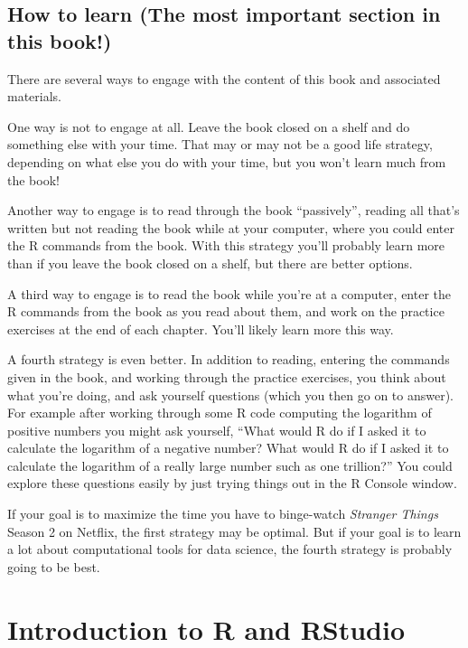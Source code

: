 \documentclass[]{krantz}
\begin{document}
\hypertarget{how-to-learn-the-most-important-section-in-this-book}{%
\section{How to learn (The most important section in this book!)}\label{how-to-learn-the-most-important-section-in-this-book}}

There are several ways to engage with the content of this book and associated materials.

One way is not to engage at all. Leave the book closed on a shelf and do something else with your time. That may or may not be a good life strategy, depending on what else you do with your time, but you won't learn much from the book!

Another way to engage is to read through the book ``passively'', reading all that's written but not reading the book while at your computer, where you could enter the R commands from the book. With this strategy you'll probably learn more than if you leave the book closed on a shelf, but there are better options.

A third way to engage is to read the book while you're at a computer, enter the R commands from the book as you read about them, and work on the practice exercises at the end of each chapter. You'll likely learn more this way.

A fourth strategy is even better. In addition to reading, entering the commands given in the book, and working through the practice exercises, you think about what you're doing, and ask yourself questions (which you then go on to answer). For example after working through some R code computing the logarithm of positive numbers you might ask yourself, ``What would R do if I asked it to calculate the logarithm of a negative number? What would R do if I asked it to calculate the logarithm of a really large number such as one trillion?'' You could explore these questions easily by just trying things out in the R Console window.

If your goal is to maximize the time you have to binge-watch \emph{Stranger Things} Season 2 on Netflix, the first strategy may be optimal. But if your goal is to learn a lot about computational tools for data science, the fourth strategy is probably going to be best.

\hypertarget{introduction-to-r-and-rstudio}{%
\chapter{Introduction to R and RStudio}\label{introduction-to-r-and-rstudio}}
\end{document}
